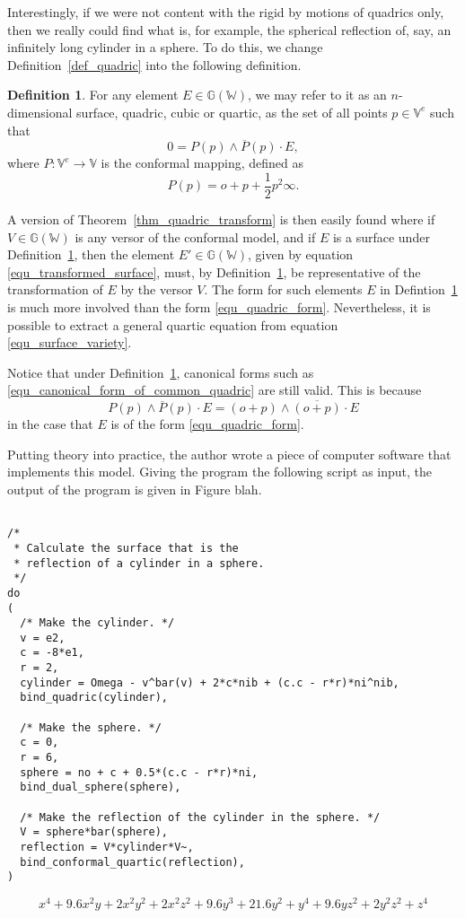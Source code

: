\documentclass{birkjour}
\theoremstyle{definition}
\newtheorem{defn}[thm]{Definition}
\theoremstyle{remark}
\numberwithin{equation}{section}
\newcommand{\G}{\mathbb{G}}
\newcommand{\V}{\mathbb{V}}
\newcommand{\W}{\mathbb{W}}
\newcommand{\nvao}{o}
\newcommand{\nvai}{\infty}
\begin{document}
Interestingly, if we were not content with the rigid by motions of
quadrics only, then we really could find what is, for example, the spherical
reflection of, say, an infinitely long cylinder in a sphere.  To do this, we change
Definition~\ref{def_quadric} into the following definition.
\begin{defn}\label{def_surface}
For any element $E\in\G(\W)$, we may refer to it as an $n$-dimensional
surface, quadric, cubic or quartic, as the set of all points $p\in\V^e$ such that
\begin{equation}\label{equ_surface_variety}
0 = P(p)\wedge\overline{P}(p)\cdot E,
\end{equation}
where $P:\V^e\to\V$ is the conformal mapping, defined as
\begin{equation}
P(p) = \nvao + p + \frac{1}{2}p^2\nvai.
\end{equation}
\end{defn}
A version of Theorem~\ref{thm_quadric_transform} is then easily found
where if $V\in\G(\W)$ is any versor of the conformal model, and if $E$
is a surface under Definition~\ref{def_surface}, then the element $E'\in\G(\W)$,
given by equation \eqref{equ_transformed_surface}, must, by Definition~\ref{def_surface},
 be representative of the transformation of $E$ by the versor $V$.  The form for
such elements $E$ in Defintion~\ref{def_surface} is much more involved than
the form \eqref{equ_quadric_form}.  Nevertheless, it is possible to extract
a general quartic equation from equation \eqref{equ_surface_variety}.

Notice that under Definition~\ref{def_surface}, canonical forms
such as \eqref{equ_canonical_form_of_common_quadric} are still valid.
This is because
\begin{equation}
P(p)\wedge\overline{P}(p)\cdot E = (\nvao+p)\wedge\overline{(\nvao+p)}\cdot E
\end{equation}
in the case that $E$ is of the form \eqref{equ_quadric_form}.

Putting theory into practice, the author wrote a piece of computer
software that implements this model.  Giving the program the following
script as input, the output of the program is given in Figure blah.
\begin{verbatim}

/*
 * Calculate the surface that is the
 * reflection of a cylinder in a sphere.
 */
do
(
  /* Make the cylinder. */
  v = e2,
  c = -8*e1,
  r = 2,
  cylinder = Omega - v^bar(v) + 2*c*nib + (c.c - r*r)*ni^nib,
  bind_quadric(cylinder),
	
  /* Make the sphere. */
  c = 0,
  r = 6,
  sphere = no + c + 0.5*(c.c - r*r)*ni,
  bind_dual_sphere(sphere),
	
  /* Make the reflection of the cylinder in the sphere. */
  V = sphere*bar(sphere),
  reflection = V*cylinder*V~,
  bind_conformal_quartic(reflection),
)
\end{verbatim}

\begin{equation}
x^{4} + 9.6x^{2}y + 2x^{2}y^{2} + 2x^{2}z^{2} +
9.6y^{3} + 21.6y^{2} + y^{4} + 9.6yz^{2} + 2y^{2}z^{2} + z^{4}
\end{equation}



\end{document}
